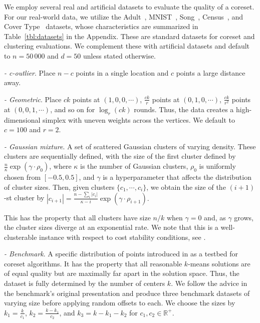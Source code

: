 We employ several real and artificial datasets to evaluate the quality of a coreset.  For our real-world data, we utilize the Adult~\cite{Dua:2019},
MNIST~\cite{mnist}, Song~\cite{song}, Census~\cite{census}, and Cover Type~\cite{covtype} datasets, whose characteristics are summarized in
Table~\ref{tbl:datasets} in the Appendix. These are standard datasets for coreset and clustering evaluations.
We complement these with artificial datasets and default to $n = 50\,000$ and $d=50$ unless stated otherwise.
\begin{description}
    \item \emph{- c-outlier}. Place $n-c$ points in a single location and $c$ points a large distance away.
    \item \emph{- Geometric}. Place $c k$ points at $(1, 0, 0, \cdots)$, $\frac{ck}{r}$ points at $(0, 1, 0, \cdots)$, $\frac{ck}{r^2}$ points
        at $(0, 0, 1, \cdots)$, and so on for $\log_r (ck)$ rounds. Thus, the data creates a high-dimensional simplex with uneven weights across the vertices. We
        default to $c = 100$ and $r=2$.
    \item \emph{- Gaussian mixture}. A set of scattered Gaussian clusters of varying density. These clusters are sequentially defined, with the size of the first
        cluster defined by $\frac{n}{\kappa} \exp \left( \gamma \cdot \rho_0 \right)$, where $\kappa$ is the number of Gaussian clusters, $\rho_0$ is uniformly
        chosen from $[-0.5, 0.5]$, and $\gamma$ is a hyperparameter that affects the distribution of cluster sizes.  Then, given clusters $\{c_1, \cdots,
        c_i\}$, we obtain the size of the $(i+1)$-st cluster by $|c_{i+1}| = \frac{n - \sum_i |c_i|}{\kappa - i}\exp \left( \gamma \cdot \rho_{i+1} \right).$

        This has the property that all clusters have size $n / k$ when $\gamma = 0$ and, as $\gamma$ grows, the cluster sizes diverge at an exponential rate.
        We note that this is a well-clusterable instance with respect to cost stability conditions, see \cite{AwS12,Cohen-AddadS17,KuK10,ORSS12}.
    \item \emph{- Benchmark}. A specific distribution of points introduced in \cite{chrisESA} as a testbed for coreset algorithms.  It has the property that
        all reasonable $k$-means solutions are of equal quality but are maximally far apart in the solution space. Thus, the dataset is fully determined by the
        number of centers $k$. We follow the advice in the benchmark's original presentation and produce three benchmark datasets of varying size before
        applying random offsets to each. We choose the sizes by $k_1 = \frac{k}{c_1}$, $k_2 = \frac{k - k_1}{c_2}$, and $k_3 = k - k_1 - k_2$ for $c_1, c_2 \in
        \mathbb{R}^+$.

\end{description}

